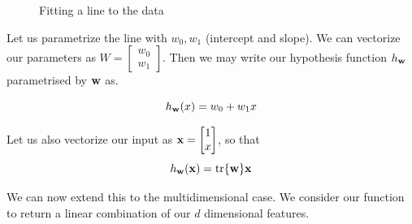 \begin{figure}[H]
  \centering
  \caption{Fitting a line to the data}
\end{figure}

Let us parametrize the line with $w_0,w_1$ (intercept and slope). We can vectorize our parameters as $W = \begin{bmatrix} w_0 \\ w_1 \end{bmatrix}$. Then we may write our hypothesis function $h_{\mathbf{w}}$ parametrised by $\mathbf{w}$ as.

$$
  h_{\mathbf{w}}(x) = w_0 + w_1 x
$$

Let us also vectorize our input as $\mathbf{x} = \begin{bmatrix} 1 \\ x \end{bmatrix}$, so that
$$
  h_{\mathbf{w}}(\mathbf{x}) = \tr{\mathbf{w}} \mathbf{x}
$$

We can now extend this to the multidimensional case. We consider our function to return a linear combination of our \(d\) dimensional features. \newline

